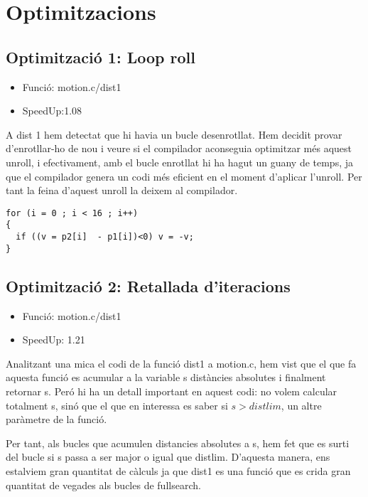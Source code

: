 

\chapter{Optimitzacions}

\section{Optimitzaci\'o 1: Loop roll}
\begin{itemize}
\item{Funció: motion.c/dist1}
\item{SpeedUp:1.08}
\end{itemize}

A dist 1 hem detectat que hi havia un bucle desenrotllat. Hem decidit provar d'enrotllar-ho de nou i veure si el compilador aconseguia optimitzar més aquest unroll, i efectivament, amb el bucle enrotllat hi ha hagut un guany de temps, ja que el compilador genera un codi més eficient en el moment d'aplicar l'unroll. Per tant la feina d'aquest unroll la deixem al compilador.

\begin{lstlisting}
for (i = 0 ; i < 16 ; i++)
{
  if ((v = p2[i]  - p1[i])<0) v = -v;
}
\end{lstlisting}
 
\section{Optimitzaci\'o 2: Retallada d'iteracions}
\begin{itemize}
\item{Funció: motion.c/dist1}
\item{SpeedUp: 1.21}
\end{itemize}

Analitzant una mica el codi de la funció dist1 a motion.c, hem vist que el que fa aquesta funció es acumular a la variable s distàncies absolutes i finalment retornar s. Peró hi ha un detall important en aquest codi: no volem calcular totalment s, sinó que el que en interessa es saber si $s>distlim$, un altre paràmetre de la funció.

Per tant, als bucles que acumulen distancies absolutes a s, hem fet que es surti del bucle si s passa a ser major o igual que distlim. D'aquesta manera, ens estalviem gran quantitat de càlculs ja que dist1 es una funció que es crida gran quantitat de vegades als bucles de fullsearch.


